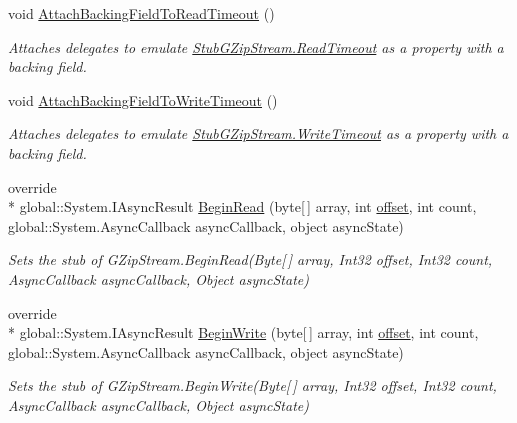 \begin{DoxyCompactItemize}
void \hyperlink{class_system_1_1_i_o_1_1_compression_1_1_fakes_1_1_stub_g_zip_stream_aa2a8100fd30d7acd2d7d73cb60f2db81}{Attach\-Backing\-Field\-To\-Read\-Timeout} ()
\begin{DoxyCompactList}\small\item\em Attaches delegates to emulate \hyperlink{class_system_1_1_i_o_1_1_compression_1_1_fakes_1_1_stub_g_zip_stream_a7cbe804d3036e2f0b6b1d99434de51bc}{Stub\-G\-Zip\-Stream.\-Read\-Timeout} as a property with a backing field.\end{DoxyCompactList}\item 
void \hyperlink{class_system_1_1_i_o_1_1_compression_1_1_fakes_1_1_stub_g_zip_stream_a1df54dd4defffb3412a899c1aa950889}{Attach\-Backing\-Field\-To\-Write\-Timeout} ()
\begin{DoxyCompactList}\small\item\em Attaches delegates to emulate \hyperlink{class_system_1_1_i_o_1_1_compression_1_1_fakes_1_1_stub_g_zip_stream_a795b558e3c37d972ad1ba5aed523795f}{Stub\-G\-Zip\-Stream.\-Write\-Timeout} as a property with a backing field.\end{DoxyCompactList}\item 
override \\*
global\-::\-System.\-I\-Async\-Result \hyperlink{class_system_1_1_i_o_1_1_compression_1_1_fakes_1_1_stub_g_zip_stream_affd85b556a9df5e0347fa16796ed9fec}{Begin\-Read} (byte\mbox{[}$\,$\mbox{]} array, int \hyperlink{jquery-1_810_82_8js_a4a9f594d20d927164551fc7fa4751a2f}{offset}, int count, global\-::\-System.\-Async\-Callback async\-Callback, object async\-State)
\begin{DoxyCompactList}\small\item\em Sets the stub of G\-Zip\-Stream.\-Begin\-Read(\-Byte\mbox{[}$\,$\mbox{]} array, Int32 offset, Int32 count, Async\-Callback async\-Callback, Object async\-State)\end{DoxyCompactList}\item 
override \\*
global\-::\-System.\-I\-Async\-Result \hyperlink{class_system_1_1_i_o_1_1_compression_1_1_fakes_1_1_stub_g_zip_stream_a0b4dd2898acc2c03c968750e961d7ca4}{Begin\-Write} (byte\mbox{[}$\,$\mbox{]} array, int \hyperlink{jquery-1_810_82_8js_a4a9f594d20d927164551fc7fa4751a2f}{offset}, int count, global\-::\-System.\-Async\-Callback async\-Callback, object async\-State)
\begin{DoxyCompactList}\small\item\em Sets the stub of G\-Zip\-Stream.\-Begin\-Write(\-Byte\mbox{[}$\,$\mbox{]} array, Int32 offset, Int32 count, Async\-Callback async\-Callback, Object async\-State)\end{DoxyCompactList}\item 

\end{DoxyCompactItemize}
